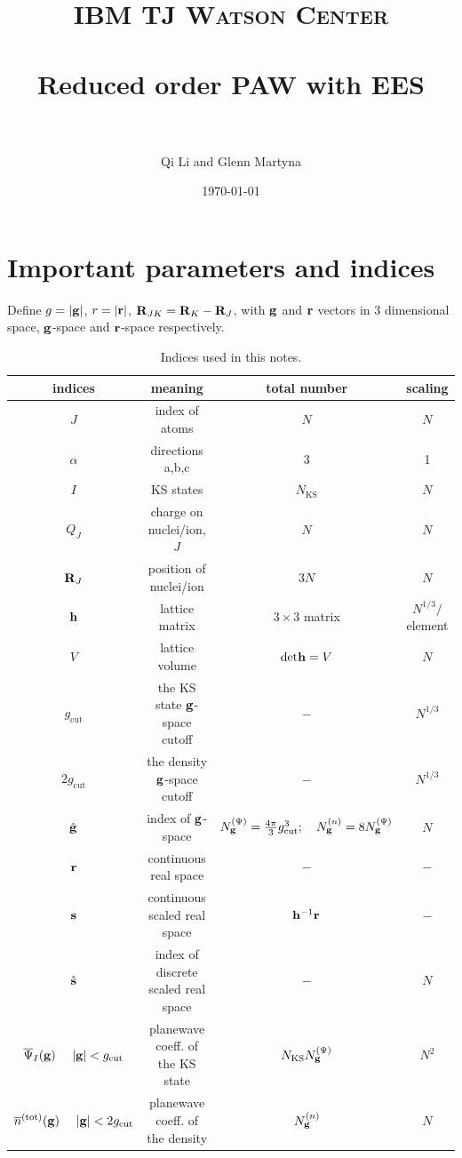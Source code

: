 \documentclass[paper=a4, fontsize=11pt]{article} %
\title{	
\normalfont \normalsize 
\textsc{IBM TJ Watson Center} \\ [14pt] %
\horrule{0.5pt} \\[0.2cm] %
\huge Reduced order PAW with EES \\ %
\horrule{2pt} \\[0.2cm] %
}
\author{Qi Li and Glenn Martyna} %
\date{\normalsize\today} %
\numberwithin{equation}{section} %
\numberwithin{figure}{section} %
\numberwithin{table}{section} %
\newcommand{\ol}{\overline}
\newcommand{\bh}{{\bf{h}}}
\newcommand{\bs}{{\bf{s}}}
\newcommand{\bg}{{\bf{g}}}
\newcommand{\br}{{\bf{r}}}
\newcommand{\bR}{{\bf{R}}}
\newcommand{\rcut}{{\mathrm{cut}}}
\newcommand{\rdet}{{\mathrm{det}}}
\newcommand{\rtot}{{\mathrm{tot}}}
\newcommand{\NKS}{{N_{\mathrm{KS}}}}
\newcommand{\Ngp}{{N^{\mathrm{(\Psi})}_\bg}}
\newcommand{\Ngn}{{N^{(n)}_\bg}}
\begin{document}
\maketitle %


\section {Important parameters and indices}

\label{Sec:parameters}

Define $g=|\bg|$, $r=|\br|$, $\bR_{JK} = \bR_K - \bR_J$, with $\bg$ and $\br$ vectors in 3 dimensional space, $\bg$-space and $\br$-space respectively.\\


\begin{table}[h!]
\caption{\label{index} Indices used in this notes.}
\begin{center}
\begin{tabular}{ c  c  c  c}
  \hline\hline
  indices & meaning & total number & scaling	\\
  \hline
  $J$ & index of atoms & $N$ &$N$ \\
  $\alpha$ & directions a,b,c & 3 & 1 \\
  $I$ & KS states & $N_{\mathrm{KS}}$ & $N$ \\
  $Q_J$ & charge on nuclei/ion, $J$ &$N$ &$N$ \\
  $\bR_J$ & position of nuclei/ion &$3N$ &$N$\\
  $\bh$ & lattice matrix & $3\times 3$ matrix & $N^{1/3}/$element\\
  $V$ & lattice volume & $\rdet \bh = V$ & $N$ \\
  $g_\rcut$ & the KS state $\bg$-space cutoff & $-$ & $N^{1/3}$ \\
  $2g_\rcut$ & the density $\bg$-space cutoff & $-$ & $N^{1/3}$ \\
  $\hat \bg$  & index of $\bg$-space & $N_\bg^{(\Psi)} = \frac{4\pi}{3}g_\rcut^3;\ \ \ N_\bg^{(n)} = 8N_\bg^{(\Psi)}$ & $N$ \\
  $\br$ & continuous real space & $-$ & $-$ \\
  $\bs$ & continuous scaled real space  & $\bh^{-1}\br$ & $-$ \\
  $\hat \bs$ & index of discrete scaled real space & $-$ & $N$ \\
  $\ol \Psi_I(\bg)\ \ \ \ |\bg|<g_{\rcut}$ & planewave coeff. of the KS state & $\NKS \Ngp$ & $N^2$ \\
  $\ol n^{(\rtot)}(\bg)\ \ \ \ |\bg|<2g_{\rcut}$ & planewave coeff. of the density & $\Ngn$ & $N$ \\
  \hline\hline
\end{tabular}
\end{center}
\end{table}
\end{document}
